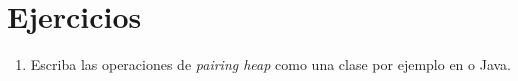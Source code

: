 \section*{Ejercicios}
\label{sec:ejercicios-26-seq2}

  \begin{enumerate}
  \item
    Escriba las operaciones de \emph{\foreignlanguage{english}{pairing heap}}
    como una clase por ejemplo en \cplusplus{} o Java.
  \end{enumerate}




